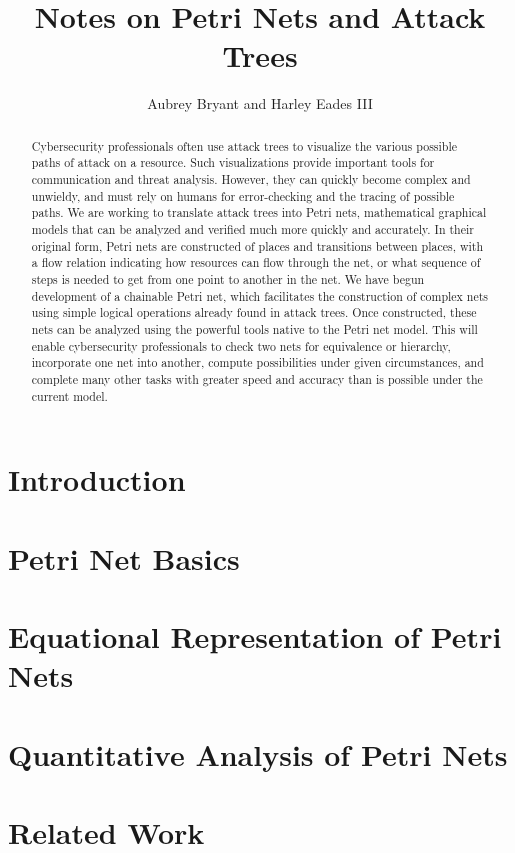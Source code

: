 \documentclass{article}
\title{Notes on Petri Nets and Attack Trees}
\author{Aubrey Bryant and Harley Eades III}
\begin{document}
\maketitle 

\begin{abstract}
  Cybersecurity professionals often use attack trees to visualize the various possible paths of attack on a resource. Such visualizations provide important tools for communication and threat analysis. However, they can quickly become complex and unwieldy, and must rely on humans for error-checking and the tracing of possible paths. We are working to translate attack trees into Petri nets, mathematical graphical models that can be analyzed and verified much more quickly and accurately. In their original form, Petri nets are constructed of places and transitions between places, with a flow relation indicating how resources can flow through the net, or what sequence of steps is needed to get from one point to another in the net. We have begun development of a chainable Petri net, which facilitates the construction of complex nets using simple logical operations already found in attack trees. Once constructed, these nets can be analyzed using the powerful tools native to the Petri net model. This will enable cybersecurity professionals to check two nets for equivalence or hierarchy, incorporate one net into another, compute possibilities under given circumstances, and complete many other tasks with greater speed and accuracy than is possible under the current model.
\end{abstract}
\section{Introduction}

\section{Petri Net Basics}

\section{Equational Representation of Petri Nets}

\section{Quantitative Analysis of Petri Nets}

\section{Related Work}

\nocite{*}


\end{document}
